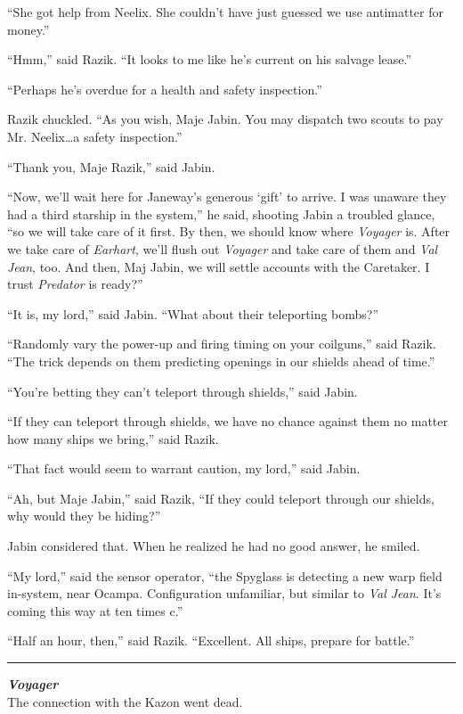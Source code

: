 \documentclass[twoside,letterpaper,12pt]{memoir}
\begin{document}
``She got help from Neelix. She couldn't have just guessed we use antimatter for money.''

``Hmm,'' said Razik. ``It looks to me like he's current on his salvage lease.''

``Perhaps he's overdue for a health and safety inspection.''

Razik chuckled. ``As you wish, Maje Jabin. You may dispatch two scouts to pay Mr. Neelix\ldots a safety inspection.''

``Thank you, Maje Razik,'' said Jabin.

``Now, we'll wait here for Janeway's generous `gift' to arrive. I was unaware they had a third starship in the system,'' he said, shooting Jabin a troubled glance, ``so we will take care of it first. By then, we should know where \textit{Voyager} is. After we take care of \textit{Earhart}, we'll flush out \textit{Voyager} and take care of them and \textit{Val Jean}, too. And then, Maj Jabin, we will settle accounts with the Caretaker. I trust \textit{Predator} is ready?''

``It is, my lord,'' said Jabin. ``What about their teleporting bombs?''

``Randomly vary the power-up and firing timing on your coilguns,'' said Razik. ``The trick depends on them predicting openings in our shields ahead of time.''

``You're betting they can't teleport through shields,'' said Jabin.

``If they can teleport through shields, we have no chance against them no matter how many ships we bring,'' said Razik.

``That fact would seem to warrant caution, my lord,'' said Jabin.

``Ah, but Maje Jabin,'' said Razik, ``If they could teleport through our shields, why would they be hiding?''

Jabin considered that. When he realized he had no good answer, he smiled.

``My lord,'' said the sensor operator, ``the Spyglass is detecting a new warp field in-system, near Ocampa. Configuration unfamiliar, but similar to \textit{Val Jean}. It's coming this way at ten times c.''

``Half an hour, then,'' said Razik. ``Excellent. All ships, prepare for battle.''

\fancybreak{\rule{3cm}{0.4 pt}}
\noindent\textit{\textbf{Voyager}}\\

The connection with the Kazon went dead.
\end{document}
